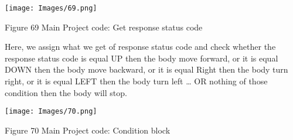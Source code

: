 \documentclass{article}
\begin{document}
\begin{center}
    \texttt{[image: Images/69.png]}

    Figure 69 Main Project code: Get response status code
\end{center}

Here, we assign what we get of response status code and check whether the response status code is equal UP then the body move forward, or it is equal DOWN then the body move backward, or it is equal Right then the body turn right, or it is equal LEFT then the body turn left … OR nothing of those condition then the body will stop.

\begin{center}
    \texttt{[image: Images/70.png]}

    Figure 70 Main Project code: Condition block
\end{center}
\end{document}
